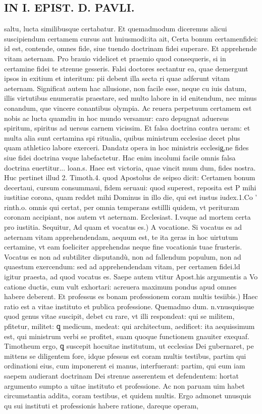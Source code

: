 \documentclass{article}
\begin{document}
\begin{pages}
\section*{IN I. EPIST. D. PAVLI. }
\marginpar{[ p.129 ]}\pstart saltu, lucta similibusque certabatur. Et quemadmodum diceremus alicui suscipiendum certamem cursus aut huiusmodi:ita ait, Certa bonum certamenfidei: id est, contende, omnes fide, siue tuendo doctrinam fidei superare. Et apprehende vitam aeternam. Pro brauio videlicet et praemio quod consequeris, si in certamine fidei te strenue gesseris. Falsi doctores sectantur ea, quae demergunt ipsos in exitium et interitum: pii debent illa secta ri quae adferunt vitam aeternam. Significat autem hac allusione, non facile esse, neque cu iuis datum, illis virtutibus enumeratis praestare, sed multo labore in id enitendum, nec minus conandum, que vincere conantibus olympia. Ac reuera perpetuum certamem est nobis ac lucta quamdiu in hoc mundo versamur: caro depugnat aduersus spiritum, spiritus ad uersus carnem vicissim. Et falsa doctrina contra ueram: et multa alia sunt certamina spi ritualia, quibus ministrum ecclesiae decet plus quam athletico labore exerceri. Dandatz opera in hoc ministris ecclesig̨,ne fides siue fidei doctrina vsque labefactetur. Hac enim incolumi facile omnis falsa doctrina euertitur... loan.s. Haec est victoria, quae vincit mum dum, fides nostra. Huc pertinet illud 2. Timoth.4. quod Apostolus de seipso dicit: Certamen bonum decertaui, cursum consummaui, fidem seruaui: quod superest, reposita est P mihi iustitiae corona, quam reddet mihi Dominus in illo die, qui est iustus iudex.1.Co ' rinth.o. omnis qui certat, per omnia temperans estillli quidem, vt perituram coronam accipiant, nos autem vt aeternam. Ecclesiast. I.vsque ad mortem certa pro iustitia. Sequitur,  \pend\pstart Ad quam et vocatus es.) A vocatione. Si vocatus es ad aeternam vitam apprehendendam, aequum est, te ita geras in hoc uirtutum certamine, vt eam foeliciter apprehendas neque fine vocationis tuae frusteris. Vocatus es non ad subtiliter disputandù, non ad fallendum populum, non ad quaestum exercendum: sed ad apprehendendam vitam, per certamen fidei.ld igitur praesta, ad quod vocatus es. Saepe autem vtitur Apost.his argumentis a Vo catione ductis, cum vult exhortari: acreuera maximum pondus apud omnes habere deberent.  \pend\pstart Et professus es bonam professionem coram multis tesiibis.) Haec ratio est a vitae instituto et publica professione. Quemadmo dum. n.vnusquisque quod genus vitae suscipit, debet cu rare, vt illi respondeat: qui se militem, pfitetur, militet: ꝗ medicum, medeat: qui architectum, aedificet: ita aequissimum est, qui ministrum verbi se profitet, suam quoque functionem gnauiter exequaf. Timotheum ergo, ꝗ suscepit hocuitae institutum, ut ecclesias Dei gubernaret, pe mittens se diligentem fore, idque pfessus est coram multis testibus, partim qui ordinationi eius, cum imponerent ei manus, interfuerant: partim, qui eum iam saepem audierant doctrinam Dei strenue asserentem et defendentem: hortat argumento sumpto a uitae instituto et professione. Ac non paruam uim habet circumstantia addita, coram testibus, et quidem multis. Ergo admonet unusquis qu sui instituti et professionis habere ratione, dareque operam, 
\end{pages}
\end{document}

